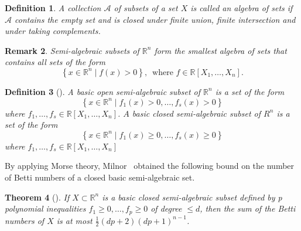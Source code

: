 \documentclass[12pt]{amsart}
\theoremstyle{plain}
\newtheorem{theorem}{Theorem}[section]
\newtheorem{remark}[theorem]{Remark}
\newtheorem{definition}[theorem]{Definition}
\newcommand{\R}{\mathbb{R}}
\numberwithin{equation}{section}
\begin{document}
\begin{definition}
A collection $\mathcal{A}$ of subsets of a set $X$ is called \emph{an algebra of sets} if $\mathcal{A}$ contains the empty set and is closed under finite union, finite intersection and under taking complements.
\end{definition}

\begin{remark}
Semi-algebraic subsets of $\R^{n}$ form the smallest algebra of sets
that contains all sets of the form
$$
\left\{x \in \R^{n} \mid f(x)>0\right\}, \,\text { where } f \in \R\left[X_{1}, \ldots, X_{n}\right].
$$
\end{remark}

\begin{definition}[{\cite[Definition~2.7.1]{bochnak2013real}}]\label{defn:basic_semi_alg_set}
A basic \emph{open semi-algebraic subset} of $\R^{n}$ is a set of the form
$$
\left\{x \in \R^{n} \mid f_{1}(x)>0, \ldots, f_{s}(x)>0\right\}
$$
where $f_{1}, \ldots, f_{s} \in \R\left[X_{1}, \ldots, X_{n}\right]$.
$A$ basic \emph{closed semi-algebraic subset} of $R^{n}$ is a set of the form
$$
\left\{x \in \R^{n} \mid f_{1}(x) \geq 0, \ldots, f_{s}(x) \geq 0\right\}
$$
where $f_{1}, \ldots, f_{s} \in \R\left[X_{1}, \ldots, X_{n}\right]$
\end{definition}

By applying Morse theory, Milnor~\cite{milnor1964betti} obtained the following bound on the number of Betti numbers of a closed basic semi-algebraic set.

\begin{theorem}[{\cite[Theorem~3]{milnor1964betti}}]\label{thm:bound_betti_basic_semi_alg}
If $X \subset \R^{n}$ is a basic closed semi-algebraic subset defined
by p polynomial inequalities $f_{1} \geq 0, \ldots, f_{p} \geq 0$ of
degree $\leq d$, then the sum of the Betti numbers of $X$ is at most
$\frac{1}{2}(d p+2)(d p+1)^{n-1}$.
\end{theorem}
\end{document}
